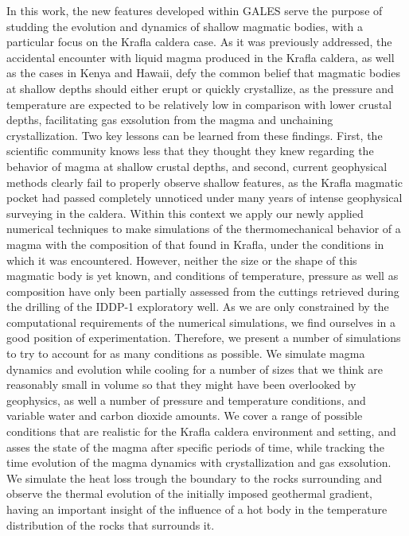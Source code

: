 In this work, the new features developed within GALES serve the purpose of studding the evolution and dynamics of shallow magmatic bodies, with a particular focus on the Krafla caldera case. As it was previously addressed, the accidental encounter with liquid magma produced in the Krafla caldera, as well as the cases in Kenya and Hawaii, defy the common belief that magmatic bodies at shallow depths should either erupt or quickly crystallize, as the pressure and temperature are expected to  be relatively low in comparison with lower crustal depths, facilitating gas exsolution from the magma and unchaining crystallization. Two key lessons can be learned from these findings. First, the scientific community knows less that they thought they knew regarding the behavior of magma at shallow crustal depths, and second, current geophysical methods clearly fail to properly observe shallow features, as the Krafla magmatic pocket had passed completely unnoticed under many years of intense geophysical surveying in the caldera. Within this context we apply our newly applied numerical techniques to make simulations of the thermomechanical behavior of a magma with the composition of that found in Krafla, under the conditions in which it was encountered. However, neither the size or the shape of this magmatic body is yet known, and conditions of temperature, pressure as well as composition have only been partially assessed from the cuttings retrieved during the drilling of the IDDP-1 exploratory well. As we are only constrained by the computational requirements of the numerical simulations, we find ourselves in a good position of experimentation. Therefore, we present a number of simulations to try to account for as many conditions as possible. We simulate magma dynamics and evolution while cooling for a number of sizes that we think are reasonably small in volume so that they might have been overlooked by geophysics, as well a number of pressure and temperature conditions, and variable water and carbon dioxide amounts. We cover a range of possible conditions that are realistic for the Krafla caldera environment and setting, and asses the state of the magma after specific periods of time, while tracking the time evolution of the magma dynamics with crystallization and gas exsolution. We simulate the heat loss trough the boundary to the rocks surrounding and observe the thermal evolution of the initially imposed geothermal gradient, having an important insight of the influence of a hot body in the temperature distribution of the rocks that surrounds it.

